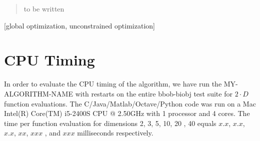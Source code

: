 \documentclass{sig-alternate}
\newcommand{\change}[1]{{\color{red} #1}}
\begin{document}

\maketitle
\begin{abstract}
to be written
\end{abstract}

[global optimization,
unconstrained optimization]



%
%
%
\section{CPU Timing}
In order to evaluate the CPU timing of the algorithm, we have run the \change{MY-ALGORITHM-NAME} with restarts on the entire bbob-biobj test suite for $2\cdot D$ function evaluations. The \change{C/Java/Matlab/Octave/Python} code was run on a \change{Mac Intel(R) Core(TM) i5-2400S CPU @ 2.50GHz} with \change{1} processor and \change{4} cores. The time per function evaluation for dimensions 2, 3, 5, 10, 20\change{, 40} equals \change{$x.x$}, \change{$x.x$}, \change{$x.x$}, \change{$xx$}, \change{$xxx$}\change{, and $xxx$} milliseconds respectively. 
\end{document}
